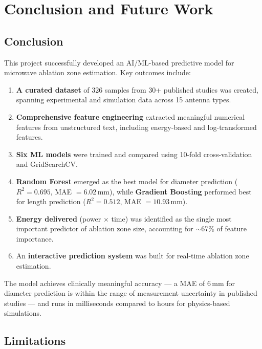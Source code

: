 \chapter{Conclusion and Future Work}

\section{Conclusion}

This project successfully developed an AI/ML-based predictive model for microwave ablation zone estimation. Key outcomes include:

\begin{enumerate}
    \item \textbf{A curated dataset} of 326 samples from 30+ published studies was created, spanning experimental and simulation data across 15 antenna types.
    \item \textbf{Comprehensive feature engineering} extracted meaningful numerical features from unstructured text, including energy-based and log-transformed features.
    \item \textbf{Six ML models} were trained and compared using 10-fold cross-validation and GridSearchCV.
    \item \textbf{Random Forest} emerged as the best model for diameter prediction ($R^2 = 0.695$, MAE $= 6.02$\,mm), while \textbf{Gradient Boosting} performed best for length prediction ($R^2 = 0.512$, MAE $= 10.93$\,mm).
    \item \textbf{Energy delivered} (power $\times$ time) was identified as the single most important predictor of ablation zone size, accounting for $\sim$67\% of feature importance.
    \item An \textbf{interactive prediction system} was built for real-time ablation zone estimation.
\end{enumerate}

The model achieves clinically meaningful accuracy --- a MAE of 6\,mm for diameter prediction is within the range of measurement uncertainty in published studies --- and runs in milliseconds compared to hours for physics-based simulations.


\section{Limitations}

